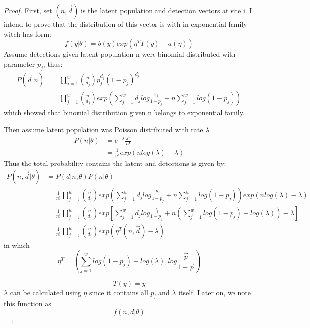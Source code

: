 \documentclass[]{article}
\begin{document}
\begin{proof}
First, set $(n,\vec{d})$ is the latent population and detection vectors at site i. I intend to prove that the distribution of this vector is with in exponential family witch has form:
\begin{equation}
	f(y|\theta)=b(y)exp(\eta^{T}T(y)-a(\eta))
\end{equation}
Assume detections given latent population n were binomial distributed with parameter $p_{j}$, thus:
\begin{equation}
	\begin{aligned}
		P(\vec{d}|n)&=\prod_{j=1}^{w}\binom{n}{d_{j}}p_{j}^{d_{j}}(1-p_{j})^{d_{j}}\\
		&=\prod_{j=1}^{w}\binom{n}{d_{j}}exp(\sum_{j=1}^{w}d_{j}log\frac{p_{j}}{1-p_{j}}+n\sum_{j=1}^{w}log(1-p_{j}))
	\end{aligned}
\end{equation}
which showed that binomial distribution given n belongs to exponential family.

Then assume latent population was Poisson distributed with rate $\lambda$
\begin{equation}
	\begin{aligned}
		P(n|\theta)&=e^{-\lambda}\frac{\lambda^{n}}{n!}\\
		&=\frac{1}{n!}exp(nlog(\lambda)-\lambda)
	\end{aligned}
\end{equation}
Thus the total probability contains the latent and detections is given by:
\begin{equation}
	\begin{aligned}
		P(n,\vec{d}|\theta)&=P(d|n,\theta)P(n|\theta)\\
		&=\frac{1}{n!}\prod_{j=1}^{w}\binom{n}{d_{j}}exp(\sum_{j=1}^{w}d_{j}log\frac{p_{j}}{1-p_{j}}+n\sum_{j=1}^{w}log(1-p_{j}))exp(nlog(\lambda)-\lambda)\\
		&=\frac{1}{n!}\prod_{j=1}^{w}\binom{n}{d_{j}}exp[\sum_{j=1}^{w}d_{j}log\frac{p_{j}}{1-p_{j}}+n(\sum_{j=1}^{w}log(1-p_{j})+log(\lambda))-\lambda]\\
		&=\frac{1}{n!}\prod_{j=1}^{w}\binom{n}{d_{j}}exp(\eta^{T}(n,\vec{d})-\lambda)
	\end{aligned}
\end{equation}
in which 
\[
\eta^{T}=(\sum_{j=1}^{w}log(1-p_{j})+log(\lambda),log\frac{\vec{p}}{1-\vec{p}})
\]

\[
T(y)=y
\]
$\lambda$ can be calculated using $\eta$ since it contains all $p_{j}$ and $\lambda$ itself.
Later on, we note this function as
\[
f(n,d|\theta)
\]
\end{proof}
\end{document}
